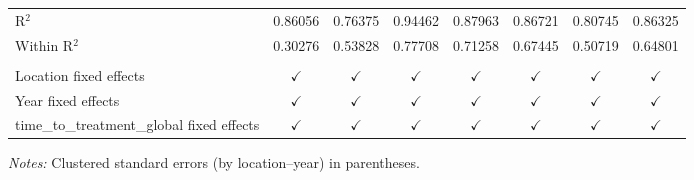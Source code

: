 \begin{tabular}{lccccccc}
   R$^2$                                        & 0.86056         & 0.76375       & 0.94462        & 0.87963               & 0.86721         & 0.80745        & 0.86325\\
   Within R$^2$                                 & 0.30276         & 0.53828       & 0.77708        & 0.71258               & 0.67445         & 0.50719        & 0.64801\\
                                                &                 &               &                &                       &                 &                &  \\
   Location fixed effects                       & $\checkmark$   & $\checkmark$ & $\checkmark$  & $\checkmark$         & $\checkmark$   & $\checkmark$  & $\checkmark$\\
   Year fixed effects                           & $\checkmark$   & $\checkmark$ & $\checkmark$  & $\checkmark$         & $\checkmark$   & $\checkmark$  & $\checkmark$\\
   time\_to\_treatment\_global fixed effects & $\checkmark$   & $\checkmark$ & $\checkmark$  & $\checkmark$         & $\checkmark$   & $\checkmark$  & $\checkmark$\\
   \bottomrule
\end{tabular}
 
\medskip \emph{Notes:} Clustered standard errors (by location--year) in parentheses.


